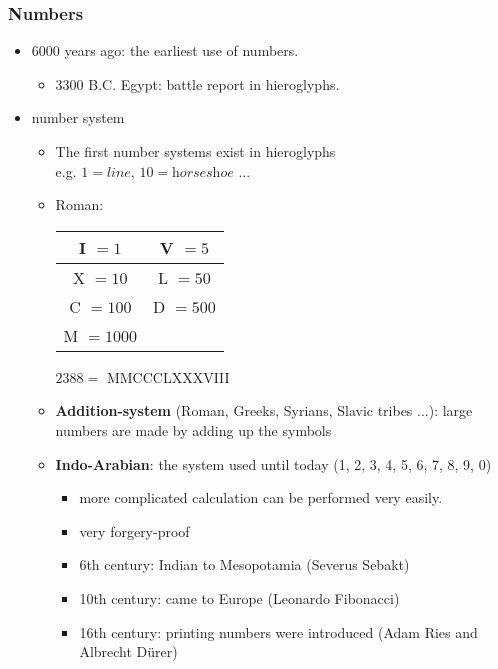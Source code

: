 \documentclass{standalone}
\begin{document}
\subsubsection*{Numbers}
\begin{itemize}
	\item 6000 years ago: the earliest use of numbers. 
		\begin{itemize}
			\item 3300 B.C. Egypt: battle report in hieroglyphs.
		\end{itemize} 
	\item number system 
		\begin{itemize}
			\item The first number systems exist in hieroglyphs \\ e.g. $1=\textit{line}$, $10=\textit{horseshoe}$ ...
			\item Roman: 

				\begin{table}[h]
				\centering
				\begin{tabular}{| c | c | }
				\hline
				I $= 1$		& V $= 5$ 	\\
				\hline 
				X $= 10$	& L $= 50$ 	\\
				\hline							
				C $= 100$	& D $= 500$ \\
				\hline					
				M $= 1000$ 	& 			\\		
				\hline					
				\end{tabular}
				\end{table}
				
				\begin{center}
				$2388 =$ MMCCCLXXXVIII
				\end{center}
			
			\item \textbf{Addition-system} (Roman, Greeks, Syrians, Slavic tribes ...): large numbers are made by adding up the symbols 
			\item \textbf{Indo-Arabian}: the system used until today (1, 2, 3, 4, 5, 6, 7, 8, 9, 0)
				\begin{itemize}
					\item more complicated calculation can be performed very easily.
					\item very forgery-proof
					\item 6th century: Indian to Mesopotamia (Severus Sebakt)
					\item 10th century: came to Europe (Leonardo Fibonacci)
					\item 16th century: printing numbers were introduced (Adam Ries and Albrecht Dürer) 
				\end{itemize}				
		\end{itemize}
\end{itemize}
\end{document}
